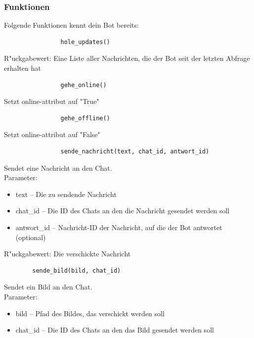 \documentclass[a4paper]{article}
\begin{document}
		\subsubsection{Funktionen}
Folgende Funktionen kennt dein Bot bereits:\\
			\begin{verbatim}
				hole_updates()
			\end{verbatim}
R"uckgabewert: Eine Liste aller Nachrichten, die der Bot seit der letzten Abfrage erhalten hat \\
			\begin{verbatim}
				gehe_online()
			\end{verbatim}
Setzt online-attribut auf "True" \\
			\begin{verbatim}
				gehe_offline()
			\end{verbatim}
Setzt online-attribut auf "False" \\
			\begin{verbatim}
				sende_nachricht(text, chat_id, antwort_id)
			\end{verbatim}
Sendet eine Nachricht an den Chat. \\
Parameter:
\begin{itemize}
	\item text -- Die zu sendende Nachricht
	\item chat\_id -- Die ID des Chats an den die Nachricht gesendet werden soll
	\item antwort\_id -- Nachricht-ID der Nachricht, auf die der Bot antwortet (optional)
\end{itemize}
R"uckgabewert: Die verschickte Nachricht \\

	\begin{verbatim}
		sende_bild(bild, chat_id)
	\end{verbatim}
Sendet ein Bild an den Chat. \\
Parameter:
\begin{itemize}
	\item bild -- Pfad des Bildes, das verschickt werden soll
	\item chat\_id -- Die ID des Chats an den das Bild gesendet werden soll
\end{itemize}
\newpage
\end{document}
